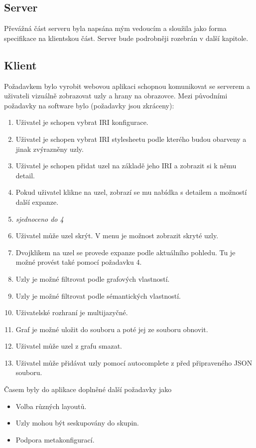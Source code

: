 \subsection{Server}
Převážná část serveru byla napsána mým vedoucím a sloužila jako forma specifikace na klientskou část. Server bude podrobněji rozebrán v další kapitole.

\subsection{Klient}
Požadavkem bylo vyrobit webovou aplikaci schopnou komunikovat se serverem a uživateli vizuálně zobrazovat uzly a hrany na obrazovce. Mezi původními požadavky na software bylo (požadavky jsou zkráceny):

\begin{enumerate}[topsep=0pt,itemsep=-1ex,partopsep=1ex,parsep=1ex]
\item Uživatel je schopen vybrat IRI konfigurace.
\item Uživatel je schopen vybrat IRI stylesheetu podle kterého budou obarveny a jinak zvýrazněny uzly.
\item Uživatel je schopen přidat uzel na základě jeho IRI a zobrazit si k němu detail.
\item Pokud uživatel klikne na uzel, zobrazí se mu nabídka s detailem a možností další expanze.
\item \textit{sjednoceno do 4}
\item Uživatel může uzel skrýt. V menu je možnost zobrazit skryté uzly.
\item Dvojklikem na uzel se provede expanze podle aktuálního pohledu. Tu je možné provést také pomocí požadavku 4.
\item Uzly je možné filtrovat podle grafových vlastností.
\item Uzly je možné filtrovat podle sémantických vlastností.
\item Uživatelské rozhraní je multijazyčné.
\item Graf je možné uložit do souboru a poté jej ze souboru obnovit.
\item Uživatel může uzel z grafu smazat.
\item Uživatel může přidávat uzly pomocí autocomplete z před připraveného JSON souboru.
\end{enumerate}

Časem byly do aplikace doplněné další požadavky jako
\begin{itemize}[topsep=0pt,itemsep=-1ex,partopsep=1ex,parsep=1ex]
\item Volba různých layoutů.
\item Uzly mohou být seskupovány do skupin.
\item Podpora metakonfigurací.
\end{itemize}